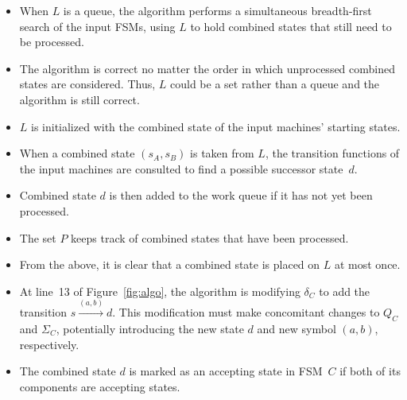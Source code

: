 \documentclass[sigplan,anonymous,review]{acmart}
\begin{document}
\begin{itemize}
\item When $L$ is a queue, the algorithm performs a simultaneous breadth-first search of the input FSMs, using $L$ to hold combined states that still need to be processed. \item The algorithm is correct no matter the order in which unprocessed combined states are considered.  Thus, $L$ could be a set rather than a queue and the algorithm is still correct.
\item
$L$ is initialized with the combined state of the input machines' starting states.  
\item When a combined state $(s_{A},s_{B})$ is taken from $L$, the transition functions of the input machines are consulted to find a possible successor state~$d$.  
\item Combined state $d$ is then added to the work queue if it has not yet been processed.   
\item The set $P$ keeps track of combined states that have been processed.
\item From the above, it is clear that a combined state is placed on $L$ at most once.
\item At line~13 of Figure~\ref{fig:algo}, the algorithm is modifying $\delta_C$ to add the transition
\(s \xrightarrow{(a,b)} d\).
This modification must make concomitant changes to $Q_C$ and $\Sigma_C$, potentially introducing the new state $d$ and new symbol $(a,b)$, respectively.
\item The combined state $d$ is marked as an accepting state in FSM~$C$ if both of its components are accepting states.
\end{itemize}
\end{document}
